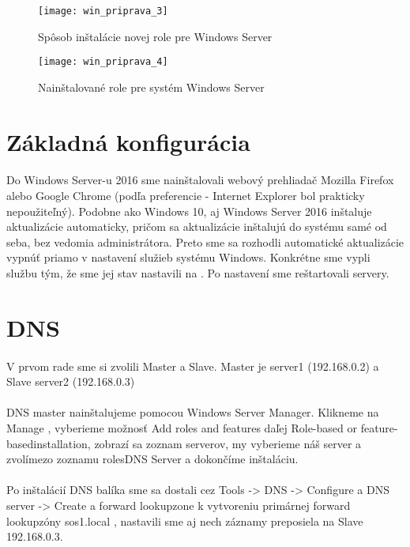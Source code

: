 \begin{figure}[!htb]
\centering
\texttt{[image: win\_priprava\_3]}
\caption{Spôsob inštalácie novej role pre Windows Server}
\label{fig:x win_prep_3}
\end{figure}

\begin{figure}[!htb]
\centering
\texttt{[image: win\_priprava\_4]}
\caption{Nainštalované role pre systém Windows Server}
\label{fig:x win_prep_4}
\end{figure}

\section{Základná konfigurácia}
\paragraph{}
Do Windows Server-u 2016 sme nainštalovali webový prehliadač Mozilla Firefox alebo Google Chrome (podľa preferencie - Internet Explorer bol prakticky nepoužiteľný). Podobne ako Windows 10, aj Windows Server 2016 inštaluje aktualizácie automaticky, pričom sa aktualizácie inštalujú do systému samé od seba, bez vedomia administrátora. Preto sme sa rozhodli automatické aktualizácie vypnúť priamo v nastavení služieb systému Windows. Konkrétne sme vypli službu  tým, že sme jej stav nastavili na . Po nastavení sme reštartovali servery.

\section{DNS}
\paragraph{}
V prvom rade sme si zvolili Master a Slave. Master je server1 (192.168.0.2) a Slave server2 (192.168.0.3)
\paragraph{}
DNS master nainštalujeme pomocou Windows Server Manager. Klikneme na Manage , vyberieme možnosť Add roles and features daľej Role-based or feature-basedinstallation, zobrazí sa  zoznam serverov, my vyberieme náš server a zvolímezo zoznamu rolesDNS Server a dokončíme inštaláciu.
\paragraph{}
Po inštalácií DNS balíka sme sa dostali cez Tools -\textgreater{} DNS -\textgreater{} Configure a DNS server -\textgreater{} Create a forward lookupzone k vytvoreniu primárnej forward lookupzóny sos1.local , nastavili sme aj  nech záznamy preposiela na Slave 192.168.0.3.
